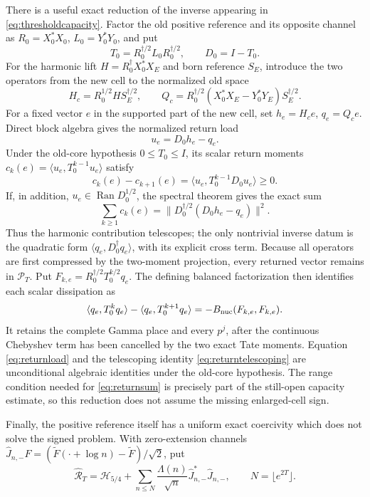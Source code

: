 \documentclass[11pt]{amsart}
\theoremstyle{definition}
\theoremstyle{remark}
\begin{document}
There is a useful exact reduction of the inverse appearing in
\eqref{eq:thresholdcapacity}.  Factor the old positive reference and its
opposite channel as \(R_0=X_0^*X_0\), \(L_0=Y_0^*Y_0\), and put
\[
 T_0=R_0^{\dagger/2}L_0R_0^{\dagger/2},\qquad D_0=I-T_0.
\]
For the harmonic lift \(H=R_0^\dagger X_0^*X_E\) and born reference
\(S_E\), introduce the two operators from the new cell to the normalized
old space
\[
 H_c=R_0^{1/2}HS_E^{\dagger/2},\qquad
 Q_c=R_0^{\dagger/2}(X_0^*X_E-Y_0^*Y_E)S_E^{\dagger/2}.
\]
For a fixed vector \(e\) in the supported part of the new cell, set
\(h_e=H_ce\), \(q_e=Q_ce\).  Direct block algebra gives the normalized
return load
\begin{equation}\label{eq:returnload}
 u_e=D_0h_e-q_e.
\end{equation}
Under the old-core hypothesis \(0\le T_0\le I\), its scalar return moments
\(c_k(e)=\langle u_e,T_0^{k-1}u_e\rangle\) satisfy
\begin{equation}\label{eq:returntelescoping}
 c_k(e)-c_{k+1}(e)
 =\langle u_e,T_0^{k-1}D_0u_e\rangle\ge0.
\end{equation}
If, in addition, \(u_e\in\operatorname{Ran}D_0^{1/2}\), the spectral
theorem gives the exact sum
\begin{equation}\label{eq:returnsum}
 \sum_{k\ge1}c_k(e)
 =\|D_0^{\dagger/2}(D_0h_e-q_e)\|^2.
\end{equation}
Thus the harmonic contribution telescopes; the only nontrivial inverse
datum is the quadratic form
\(\langle q_e,D_0^\dagger q_e\rangle\), with its explicit cross term.
Because all operators are first compressed by the two-moment projection,
every returned vector remains in \(\mathcal P_T\).  Put
\(F_{k,e}=R_0^{\dagger/2}T_0^{k/2}q_e\).  The defining balanced
factorization then identifies each scalar dissipation as
\begin{equation}\label{eq:returnDissipation}
 \langle q_e,T_0^kq_e\rangle-\langle q_e,T_0^{k+1}q_e\rangle
 =-B_{\rm nuc}(F_{k,e},F_{k,e}).
\end{equation}
It retains the complete Gamma place and every \(p^j\), after the continuous
Chebyshev term has been cancelled by the two exact Tate moments.  Equation
\eqref{eq:returnload} and the telescoping identity
\eqref{eq:returntelescoping} are unconditional algebraic identities under
the old-core hypothesis.  The range condition needed for
\eqref{eq:returnsum} is precisely part of the still-open capacity estimate,
so this reduction does not assume the missing enlarged-cell sign.

Finally, the positive reference itself has a uniform exact coercivity which
does not solve the signed problem.  With zero-extension channels
\(\widehat J_{n,-}F=(\widetilde F(\cdot+\log n)-\widetilde F)/\sqrt2\), put
\[
 \widehat{\mathcal R}_T=\mathcal H_{5/4}
 +\sum_{n\le N}\frac{\Lambda(n)}{\sqrt n}
       \widehat J_{n,-}^*\widehat J_{n,-},
 \qquad N=\lfloor e^{2T}\rfloor .
\]
\end{document}
